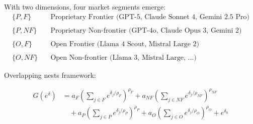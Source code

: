 \documentclass[aspectratio=169]{beamer}
\begin{document}
\begin{frame}


With two dimensions, four market segments emerge:
\bigskip{}
\begin{align*}
\{P,F\} &\quad \text{Proprietary Frontier (GPT-5, Claude Sonnet 4, Gemini 2.5 Pro)}\\
&\\
\{P,NF\} &\quad \text{Proprietary Non-frontier (GPT-4o, Claude Opus 3, Gemini 2)}\\
&\\
\{O,F\} &\quad \text{Open Frontier (Llama 4 Scout, Mistral Large 2)}\\
&\\
\{O,NF\} &\quad \text{Open Non-frontier (Llama 3, Mistral Large, ...)}
\end{align*}


\bigskip{}




\end{frame}


\begin{frame}


Overlapping nests framework:


\begin{align*}
G(e^{\delta}) &= a_F \left(\sum_{j \in F} e^{\delta_j/\rho_F}\right)^{\rho_F} + a_{NF} \left(\sum_{j \in NF} e^{\delta_j/\rho_{NF}}\right)^{\rho_{NF}}\\
&\quad + a_P \left(\sum_{j \in P} e^{\delta_j/\rho_P}\right)^{\rho_P} + a_O \left(\sum_{j \in O} e^{\delta_j/\rho_O}\right)^{\rho_O} + e^{\delta_0}
\end{align*}
\bigskip{}


\onslide<2->{
where $a_F + a_{NF} = 1$, $a_P + a_O = 1$, and $\rho$ parameters $\in (0,1]$
}


\bigskip{}




\end{frame}
\end{document}
